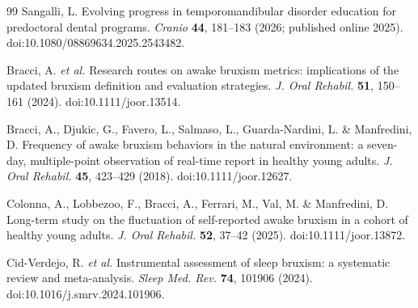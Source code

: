 \documentclass[pdflatex,sn-nature,iicol]{sn-jnl}
\begin{document}
\begin{thebibliography}{99}
Sangalli, L. Evolving progress in temporomandibular disorder education for predoctoral dental programs. \emph{Cranio} \textbf{44}, 181--183 (2026; published online 2025). doi:10.1080/08869634.2025.2543482.

Bracci, A. \emph{et al.} Research routes on awake bruxism metrics: implications of the updated bruxism definition and evaluation strategies. \emph{J. Oral Rehabil.} \textbf{51}, 150--161 (2024). doi:10.1111/joor.13514.

Bracci, A., Djukic, G., Favero, L., Salmaso, L., Guarda-Nardini, L. \& Manfredini, D. Frequency of awake bruxism behaviors in the natural environment: a seven-day, multiple-point observation of real-time report in healthy young adults. \emph{J. Oral Rehabil.} \textbf{45}, 423--429 (2018). doi:10.1111/joor.12627.

Colonna, A., Lobbezoo, F., Bracci, A., Ferrari, M., Val, M. \& Manfredini, D. Long-term study on the fluctuation of self-reported awake bruxism in a cohort of healthy young adults. \emph{J. Oral Rehabil.} \textbf{52}, 37--42 (2025). doi:10.1111/joor.13872.

Cid-Verdejo, R. \emph{et al.} Instrumental assessment of sleep bruxism: a systematic review and meta-analysis. \emph{Sleep Med. Rev.} \textbf{74}, 101906 (2024). doi:10.1016/j.smrv.2024.101906.
\color{black}

\color{blue}
\end{thebibliography}
\color{black}

\color{black}
\end{document}
